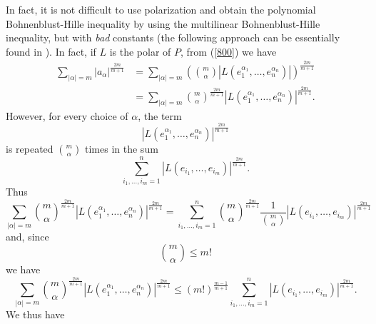 \documentclass[10pt]{amsart}
\numberwithin{equation}{section}
\begin{document}
In fact, it is not difficult to use polarization and obtain the polynomial
Bohnenblust-Hille inequality by using the multilinear Bohnenblust-Hille
inequality, but with \emph{bad} constants (the following approach can be
essentially found in \cite[Lemma 5]{defant2}). In fact, if $L$ is the polar
of $P$, from (\ref{800}) we have
\begin{align*}
{\sum\limits_{\left\vert \alpha \right\vert =m}}\left\vert a_{\alpha
}\right\vert ^{\frac{2m}{m+1}}& ={\sum\limits_{\left\vert \alpha \right\vert
=m}}\left( \binom{m}{\alpha }\left\vert L(e_{1}^{\alpha _{1}},\ldots
,e_{n}^{\alpha _{n}})\right\vert \right) ^{\frac{2m}{m+1}} \\
& ={\sum\limits_{\left\vert \alpha \right\vert =m}}\binom{m}{\alpha }^{\frac{2m}{m+1}}\left\vert L(e_{1}^{\alpha _{1}},\ldots ,e_{n}^{\alpha
_{n}})\right\vert ^{\frac{2m}{m+1}}.
\end{align*}However, for every choice of $\alpha $, the term
\begin{equation*}
\left\vert L(e_{1}^{\alpha _{1}},\ldots ,e_{n}^{\alpha _{n}})\right\vert ^{\frac{2m}{m+1}}
\end{equation*}is repeated $\binom{m}{\alpha }$ times in the sum
\begin{equation*}
{\sum\limits_{i_{1},\ldots ,i_{m}=1}^{n}}\left\vert L(e_{i_{1}},\ldots
,e_{i_{m}})\right\vert ^{\frac{2m}{m+1}}.
\end{equation*}Thus
\begin{equation*}
{\sum\limits_{\left\vert \alpha \right\vert =m}}\binom{m}{\alpha }^{\frac{2m}{m+1}}\left\vert L(e_{1}^{\alpha _{1}},\ldots ,e_{n}^{\alpha
_{n}})\right\vert ^{\frac{2m}{m+1}}={\sum\limits_{i_{1},\ldots ,i_{m}=1}^{n}}\binom{m}{\alpha }^{\frac{2m}{m+1}}\frac{1}{\binom{m}{\alpha }}\left\vert
L(e_{i_{1}},\ldots ,e_{i_{m}})\right\vert ^{\frac{2m}{m+1}}
\end{equation*}and, since
\begin{equation*}
\binom{m}{\alpha }\leq m!
\end{equation*}we have
\begin{equation*}
{\sum\limits_{\left\vert \alpha \right\vert =m}}\binom{m}{\alpha }^{\frac{2m}{m+1}}\left\vert L(e_{1}^{\alpha _{1}},\ldots ,e_{n}^{\alpha
_{n}})\right\vert ^{\frac{2m}{m+1}}\leq \left( m!\right) ^{\frac{m-1}{m+1}}{\sum\limits_{i_{1},\ldots ,i_{m}=1}^{n}}\left\vert L(e_{i_{1}},\ldots
,e_{i_{m}})\right\vert ^{\frac{2m}{m+1}}.
\end{equation*}We thus have
\end{document}
